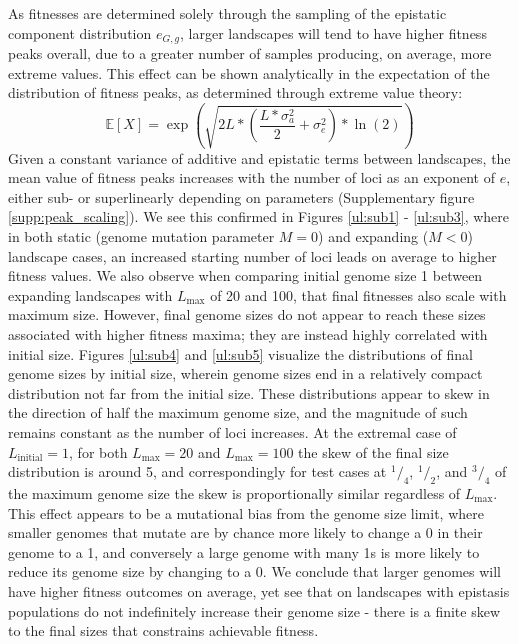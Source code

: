 \documentclass[paper=a4, fontsize=11pt,twoside]{scrartcl}       %
\begin{document}
As fitnesses are determined solely through the sampling of the epistatic component distribution $e_{G,g}$, larger landscapes will tend to have higher fitness peaks overall, due to a greater number of samples producing, on average, more extreme values. This effect can be shown analytically in the expectation of the distribution of fitness peaks, as determined through extreme value theory:  $$\mathbb{E}[X] = \exp{\left(\sqrt{2L \ast (\frac{L \ast \sigma_a^2}{2} + \sigma_e^2) \ast \ln(2)}\right)}$$ Given a constant variance of additive and epistatic terms between landscapes, the mean value of fitness peaks increases with the number of loci as an exponent of $e$, either sub- or superlinearly depending on parameters (Supplementary figure \ref{supp:peak_scaling}). We see this confirmed in Figures \ref{ul:sub1} - \ref{ul:sub3}, where in both static (genome mutation parameter $M = 0$) and expanding ($M < 0$) landscape cases, an increased starting number of loci leads on average to higher fitness values. We also observe when comparing initial genome size 1 between expanding landscapes with $L_{\text{max}}$ of 20 and 100, that final fitnesses also scale with maximum size. However, final genome sizes do not appear to reach these sizes associated with higher fitness maxima; they are instead highly correlated with initial size. Figures \ref{ul:sub4} and \ref{ul:sub5} visualize the distributions of final genome sizes by initial size, wherein genome sizes end in a relatively compact distribution not far from the initial size. These distributions appear to skew in the direction of half the maximum genome size, and the magnitude of such remains constant as the number of loci increases. At the extremal case of $L_{\text{initial}} = 1$, for both $L_{\text{max}} = 20$ and $L_{\text{max}} = 100$ the skew of the final size distribution is around 5, and correspondingly for test cases at $^1/_4$, $^1/_2$, and $^3/_4$ of the maximum genome size the skew is proportionally similar regardless of $L_{\text{max}}$. This effect appears to be a mutational bias from the genome size limit, where smaller genomes that mutate are by chance more likely to change a 0 in their genome to a 1, and conversely a large genome with many 1s is more likely to reduce its genome size by changing to a 0. We conclude that larger genomes will have higher fitness outcomes on average, yet see that on landscapes with epistasis populations do not indefinitely increase their genome size - there is a finite skew to the final sizes that constrains achievable fitness.
\end{document}
